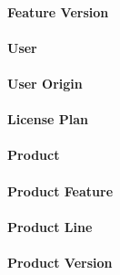 \documentclass[12pt]{report}
\begin{document}
\paragraph*{Feature Version}

\paragraph*{User}

\paragraph*{User Origin}

\paragraph*{License Plan}

\paragraph*{Product}

\paragraph*{Product Feature}

\paragraph*{Product Line}

\paragraph*{Product Version}
\end{document}
